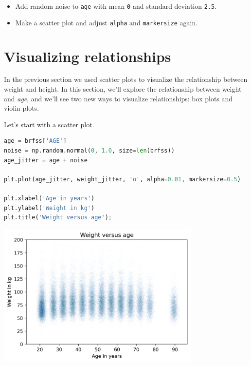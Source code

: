 \begin{itemize}

\item
  Add random noise to \passthrough{\lstinline!age!} with mean
  \passthrough{\lstinline!0!} and standard deviation
  \passthrough{\lstinline!2.5!}.
\item
  Make a scatter plot and adjust \passthrough{\lstinline!alpha!} and
  \passthrough{\lstinline!markersize!} again.
\end{itemize}

\section{Visualizing relationships}\label{visualizing-relationships}

In the previous section we used scatter plots to visualize the
relationship between weight and height. In this section, we'll explore
the relationship between weight and \emph{age}, and we'll see two new
ways to visualize relationships: box plots and violin plots.

Let's start with a scatter plot.

\begin{lstlisting}[language=Python,style=source]
age = brfss['AGE']
noise = np.random.normal(0, 1.0, size=len(brfss))
age_jitter = age + noise

plt.plot(age_jitter, weight_jitter, 'o', alpha=0.01, markersize=0.5)

plt.xlabel('Age in years')
plt.ylabel('Weight in kg')
plt.title('Weight versus age');
\end{lstlisting}

\begin{center}
\includegraphics[width=4in]{chapters/09_relationships_files/09_relationships_39_0.png}
\end{center}

